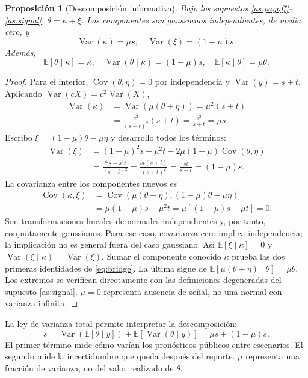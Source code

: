 \documentclass[11pt]{article}
\newcommand{\E}{\mathbb E}
\newcommand{\Var}{\operatorname{Var}}
\newcommand{\Cov}{\operatorname{Cov}}
\newtheorem{proposition}{Proposición}
\begin{document}
\begin{proposition}[Descomposición informativa]\label{prop:information}
Bajo los supuestos \ref{as:payoff}--\ref{as:signal}, $\theta=\kappa+\xi$.
Los componentes son gaussianos independientes, de media cero, y
\begin{equation}\label{eq:variances}
 \Var(\kappa)=\mu s,\quad \Var(\xi)=(1-\mu)s.
\end{equation}
Además,
\begin{equation}\label{eq:bridge}
 \E[\theta\mid\kappa]=\kappa,\quad
 \Var(\theta\mid\kappa)=(1-\mu)s,\quad
 \E[\kappa\mid\theta]=\mu\theta.
\end{equation}
\end{proposition}
\begin{proof}
Para el interior, $\Cov(\theta,\eta)=0$ por independencia y
$\Var(y)=s+t$. Aplicando $\Var(cX)=c^2\Var(X)$,
\begin{align}
 \Var(\kappa)&=\Var(\mu(\theta+\eta))=\mu^2(s+t)\\
 &=\frac{s^2}{(s+t)^2}(s+t)=\frac{s^2}{s+t}=\mu s.
\end{align}
Escribo $\xi=(1-\mu)\theta-\mu\eta$ y desarrollo todos los términos:
\begin{align}
 \Var(\xi)&=(1-\mu)^2s+\mu^2t-2\mu(1-\mu)\Cov(\theta,\eta)\\
 &=\frac{t^2s+s^2t}{(s+t)^2}
 =\frac{st(s+t)}{(s+t)^2}=\frac{st}{s+t}=(1-\mu)s.
\end{align}
La covarianza entre los componentes nuevos es
\begin{align}
 \Cov(\kappa,\xi)
 &=\Cov(\mu(\theta+\eta),(1-\mu)\theta-\mu\eta)\\
 &=\mu(1-\mu)s-\mu^2t
 =\mu[(1-\mu)s-\mu t]=0.
\end{align}
Son transformaciones lineales de normales independientes y, por tanto,
conjuntamente gaussianos. Para ese caso, covarianza cero implica
independencia; la implicación no es general fuera del caso gaussiano.
Así $\E[\xi\mid\kappa]=0$ y $\Var(\xi\mid\kappa)=\Var(\xi)$.
Sumar el componente conocido $\kappa$ prueba las dos primeras identidades
de \eqref{eq:bridge}. La última sigue de
$\E[\mu(\theta+\eta)\mid\theta]=\mu\theta$. Los extremos se verifican
directamente con las definiciones degeneradas del supuesto \ref{as:signal}.
$\mu=0$ representa ausencia de señal, no una normal con varianza infinita.
\end{proof}

La ley de varianza total permite interpretar la descomposición:
\begin{equation}
 s=\Var(\E[\theta\mid y])+\E[\Var(\theta\mid y)]
   =\mu s+(1-\mu)s.
\end{equation}
El primer término mide cómo varían los pronósticos públicos entre escenarios.
El segundo mide la incertidumbre que queda después del reporte. $\mu$
representa una fracción de varianza, no del valor realizado de $\theta$.
\end{document}
